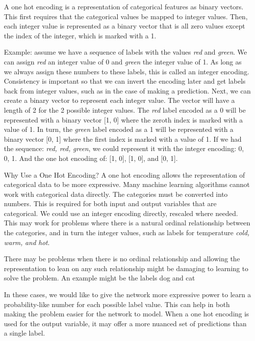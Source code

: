 \documentclass[12pt]{report}
\begin{document}
A one hot encoding is a representation of categorical features as binary vectors. This first requires that the categorical values be mapped to integer values. Then, each integer value is represented as a binary vector that is all zero values except the index of the integer, which is marked with a 1.

Example: assume we have a sequence of labels with the values \textit{red} and \textit{green}. We can assign \textit{red} an integer value of 0 and \textit{green} the integer value of 1. As long as we always assign these numbers to these labels, this is called an integer encoding. Consistency is important so that we can invert the encoding later and get labels back from integer values, such as in the case of making a prediction. Next, we can create a binary vector to represent each integer value. The vector will have a length of 2 for the 2 possible integer values. The \textit{red} label encoded as a 0 will be represented with a binary vector [1, 0] where the zeroth index is marked with a value of 1. In turn, the \textit{green} label encoded as a 1 will be represented with a binary vector [0, 1] where the first index is marked with a value of 1. If we had the sequence: \textit{red, red, green}, we could represent it with the integer encoding: 0, 0, 1. And the one hot encoding of:
[1, 0], [1, 0], and [0, 1].

Why Use a One Hot Encoding?
A one hot encoding allows the representation of categorical data to be more expressive. Many machine learning algorithms cannot work with categorical data directly. The categories must be converted into numbers. This is required for both input and output variables that are categorical. We could use an integer encoding directly, rescaled where needed. This may work for problems where there is a natural ordinal relationship between the categories, and in turn the integer values, such as labels for temperature \textit{cold, warm, and hot}.

There may be problems when there is no ordinal relationship and allowing the representation to lean on any such relationship might be damaging to learning to solve the problem. An example might be the labels dog and cat

In these cases, we would like to give the network more expressive power to learn a probability-like number for each possible label value. This can help in both making the problem easier for the network to model. When a one hot encoding is used for the output variable, it may offer a more nuanced set of predictions than a single label.
\end{document}
